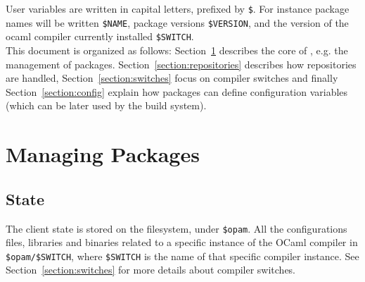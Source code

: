 \documentclass[a4paper,10pt]{article}
\begin{document}
User variables are written in capital letters, prefixed by \verb+$+. For
instance package names will be written \verb+$NAME+, package versions
\verb+$VERSION+, and the version of the ocaml compiler currently
installed \verb+$SWITCH+.\\

This document is organized as follows: Section~\ref{section:packages}
describes the core of \OPAM, e.g. the management of
packages. Section~\ref{section:repositories} describes how
repositories are handled, Section~\ref{section:switches} focus on
compiler switches and finally Section~\ref{section:config} explain how
packages can define configuration variables (which can be later used
by the build system).

\section{Managing Packages}
\label{section:packages}

\subsection{State}

The client state is stored on the filesystem, under {\tt \$opam}.
All the configurations files, libraries and binaries related to a
specific instance of the OCaml compiler in \verb+$opam/$SWITCH+, where
\verb+$SWITCH+ is the name of that specific compiler instance. See
Section~\ref{section:switches} for more details about compiler
switches.
\end{document}

